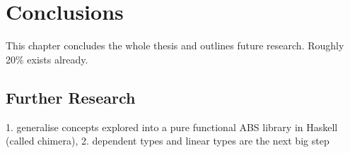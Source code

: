 \chapter{Conclusions}
This chapter concludes the whole thesis and outlines future research. Roughly 20\% exists already.


\section{Further Research}
1. generalise concepts explored into a pure functional ABS library in Haskell (called chimera), 2. dependent types and linear types are the next big step